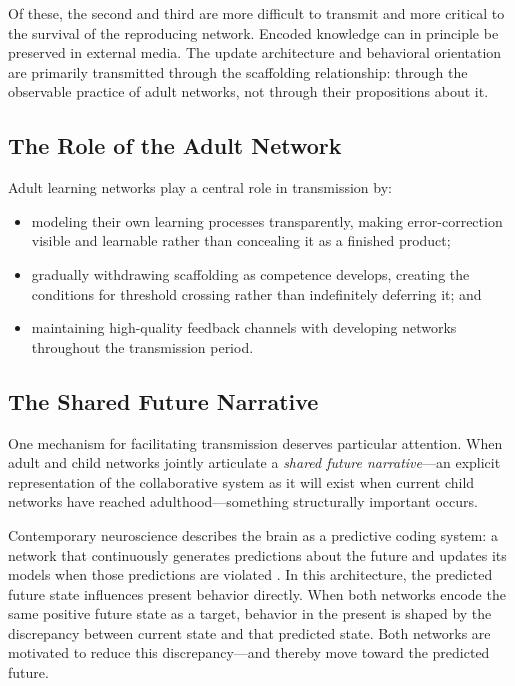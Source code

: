 \documentclass[11pt]{article}
\begin{document}
Of these, the second and third are more difficult to transmit and more critical to the
survival of the reproducing network. Encoded knowledge can in principle be preserved in
external media. The update architecture and behavioral orientation are primarily transmitted
through the scaffolding relationship: through the observable practice of adult networks, not
through their propositions about it.

\subsection{The Role of the Adult Network}

Adult learning networks play a central role in transmission by:

\begin{itemize}
    \item modeling their own learning processes transparently, making error-correction
          visible and learnable rather than concealing it as a finished product;
    \item gradually withdrawing scaffolding as competence develops, creating the conditions
          for threshold crossing rather than indefinitely deferring it; and
    \item maintaining high-quality feedback channels with developing networks throughout
          the transmission period.
\end{itemize}

\subsection{The Shared Future Narrative}

One mechanism for facilitating transmission deserves particular attention. When adult and
child networks jointly articulate a \emph{shared future narrative}---an explicit
representation of the collaborative system as it will exist when current child networks have
reached adulthood---something structurally important occurs.

Contemporary neuroscience describes the brain as a predictive coding system: a network that
continuously generates predictions about the future and updates its models when those
predictions are violated \cite{friston2010, clark2016}. In this architecture, the predicted
future state influences present behavior directly. When both networks encode the same
positive future state as a target, behavior in the present is shaped by the discrepancy
between current state and that predicted state. Both networks are motivated to reduce this
discrepancy---and thereby move toward the predicted future.
\end{document}
